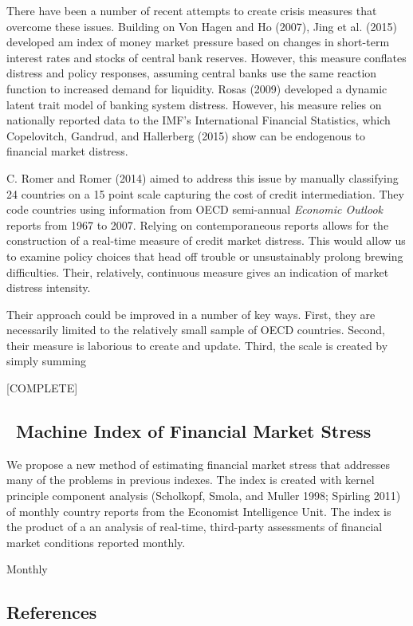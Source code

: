 \documentclass[]{article}
\begin{document}
There have been a number of recent attempts to create crisis measures
that overcome these issues. Building on {Von Hagen} and Ho (2007), Jing
et al. (2015) developed am index of money market pressure based on
changes in short-term interest rates and stocks of central bank
reserves. However, this measure conflates distress and policy responses,
assuming central banks use the same reaction function to increased
demand for liquidity. Rosas (2009) developed a dynamic latent trait
model of banking system distress. However, his measure relies on
nationally reported data to the IMF's International Financial
Statistics, which Copelovitch, Gandrud, and Hallerberg (2015) show can
be endogenous to financial market distress.

C. Romer and Romer (2014) aimed to address this issue by manually
classifying 24 countries on a 15 point scale capturing the cost of
credit intermediation. They code countries using information from OECD
semi-annual \emph{Economic Outlook} reports from 1967 to 2007. Relying
on contemporaneous reports allows for the construction of a real-time
measure of credit market distress. This would allow us to examine policy
choices that head off trouble or unsustainably prolong brewing
difficulties. Their, relatively, continuous measure gives an indication
of market distress intensity.

Their approach could be improved in a number of key ways. First, they
are necessarily limited to the relatively small sample of OECD
countries. Second, their measure is laborious to create and update.
Third, the scale is created by simply summing

{[}COMPLETE{]}

\subsection{~Machine Index of Financial Market
Stress}\label{machine-index-of-financial-market-stress}

We propose a new method of estimating financial market stress that
addresses many of the problems in previous indexes. The index is created
with kernel principle component analysis (Scholkopf, Smola, and Muller
1998; Spirling 2011) of monthly country reports from the Economist
Intelligence Unit. The index is the product of a an analysis of
real-time, third-party assessments of financial market conditions
reported monthly.

Monthly

\subsection*{References}\label{references}
\end{document}
